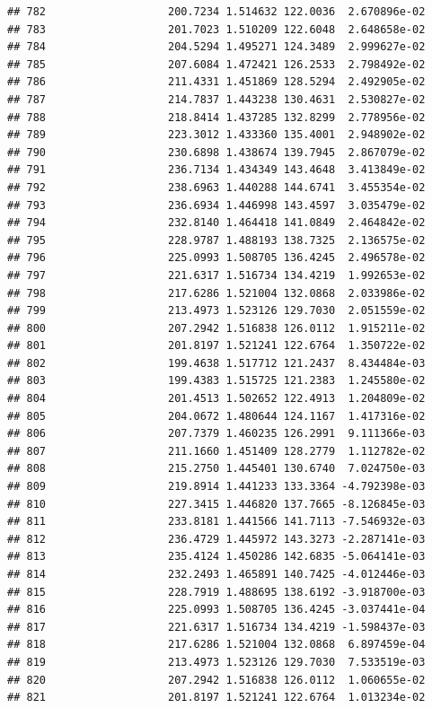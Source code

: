 \documentclass[
]{article}
\begin{document}
\begin{verbatim}
## 782                   200.7234 1.514632 122.0036  2.670896e-02
## 783                   201.7023 1.510209 122.6048  2.648658e-02
## 784                   204.5294 1.495271 124.3489  2.999627e-02
## 785                   207.6084 1.472421 126.2533  2.798492e-02
## 786                   211.4331 1.451869 128.5294  2.492905e-02
## 787                   214.7837 1.443238 130.4631  2.530827e-02
## 788                   218.8414 1.437285 132.8299  2.778956e-02
## 789                   223.3012 1.433360 135.4001  2.948902e-02
## 790                   230.6898 1.438674 139.7945  2.867079e-02
## 791                   236.7134 1.434349 143.4648  3.413849e-02
## 792                   238.6963 1.440288 144.6741  3.455354e-02
## 793                   236.6934 1.446998 143.4597  3.035479e-02
## 794                   232.8140 1.464418 141.0849  2.464842e-02
## 795                   228.9787 1.488193 138.7325  2.136575e-02
## 796                   225.0993 1.508705 136.4245  2.496578e-02
## 797                   221.6317 1.516734 134.4219  1.992653e-02
## 798                   217.6286 1.521004 132.0868  2.033986e-02
## 799                   213.4973 1.523126 129.7030  2.051559e-02
## 800                   207.2942 1.516838 126.0112  1.915211e-02
## 801                   201.8197 1.521241 122.6764  1.350722e-02
## 802                   199.4638 1.517712 121.2437  8.434484e-03
## 803                   199.4383 1.515725 121.2383  1.245580e-02
## 804                   201.4513 1.502652 122.4913  1.204809e-02
## 805                   204.0672 1.480644 124.1167  1.417316e-02
## 806                   207.7379 1.460235 126.2991  9.111366e-03
## 807                   211.1660 1.451409 128.2779  1.112782e-02
## 808                   215.2750 1.445401 130.6740  7.024750e-03
## 809                   219.8914 1.441233 133.3364 -4.792398e-03
## 810                   227.3415 1.446820 137.7665 -8.126845e-03
## 811                   233.8181 1.441566 141.7113 -7.546932e-03
## 812                   236.4729 1.445972 143.3273 -2.287141e-03
## 813                   235.4124 1.450286 142.6835 -5.064141e-03
## 814                   232.2493 1.465891 140.7425 -4.012446e-03
## 815                   228.7919 1.488695 138.6192 -3.918700e-03
## 816                   225.0993 1.508705 136.4245 -3.037441e-04
## 817                   221.6317 1.516734 134.4219 -1.598437e-03
## 818                   217.6286 1.521004 132.0868  6.897459e-04
## 819                   213.4973 1.523126 129.7030  7.533519e-03
## 820                   207.2942 1.516838 126.0112  1.060655e-02
## 821                   201.8197 1.521241 122.6764  1.013234e-02

\end{verbatim}
\end{document}
